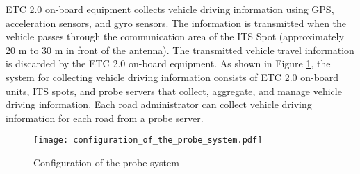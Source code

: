 \documentclass[paper]{ieice}
\begin{document}
%
\par
%
ETC 2.0 on-board equipment collects vehicle driving information using GPS, acceleration sensors, and gyro sensors.
%
The information is transmitted when the vehicle passes through the communication area of the ITS Spot (approximately 20 m to 30 m in front of the antenna).
%
The transmitted vehicle travel information is discarded by the ETC 2.0 on-board equipment.
%
As shown in Figure \ref{fig:configuration_of_the_probe_system}, the system for collecting vehicle driving information consists of ETC 2.0 on-board units, ITS spots, and probe servers that collect, aggregate, and manage vehicle driving information.
%
Each road administrator can collect vehicle driving information for each road from a probe server.
%
\begin{figure}[tb]
  \begin{center}
    \texttt{[image: configuration\_of\_the\_probe\_system.pdf]}
  \end{center}
  \caption{Configuration of the probe system}
  \label{fig:configuration_of_the_probe_system}
\end{figure}
%


\begin{thebibliography}{99}%
\bibitem{}
\end{thebibliography}

\end{document}

